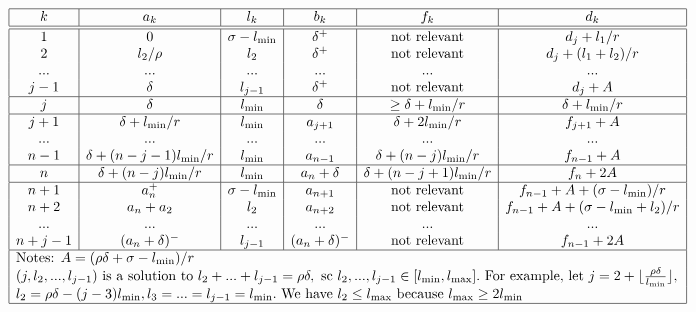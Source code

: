 \begin{preuve}
{\begin{table*}[!htbp]
 \hspace{-1cm}
   $$\begin{array}{|c|c|c|c|c|c|}
 \hline
  k & a_k & l_k & b_k & f_k & d_k \\
 \hline
 \hline
 1 & 0 & \sigma -  l_{\min} & \delta^+ & \mbox{not relevant} & d_j+l_1/r\\
 2 & l_2/\rho & l_{2} & \delta^+ & \mbox{not relevant} & d_j+(l_1+l_2)/r\\
 ... & ... & ... & ... &... & ... \\
 j-1 &  \delta & l_{j-1} & \delta^+ & \mbox{not relevant} & d_j +A \\
 \hline
 j & \delta & l_{\min} & \delta & \geq \delta +l_{\min}/r  & \delta +l_{\min}/r \\
 \hline
 j+1& \delta+l_{\min}/r & l_{\min} & a_{j+1} & \delta+2 l_{\min}/r
 & f_{j+1} + A \\
 ... & ... & ... & ... &... & ... \\
 n-1 & \delta+ (n-j-1)l_{\min}/r & l_{\min} & a_{n-1} & \delta+(n-j) l_{\min}/r & f_{n-1} + A \\
 \hline
 n & \delta+ (n-j)l_{\min}/r & l_{\min} & a_n + \delta & \delta+(n-j+1) l_{\min}/r & f_n + 2 A \\
 \hline
 n+1 & a_n^+ & \sigma - l_{\min} & a_{n+1} & \mbox{not relevant} & f_{n-1}+A+(\sigma - l_{\min} )/r\\
 n+2 & a_n+a_2 & l_{2} & a_{n+2} & \mbox{not relevant} & f_{n-1}+A+(\sigma - l_{\min}+l_2 )/r\\
 ... & ... & ... & ... &... &...  \\
 n+j-1 & (a_n + \delta)^- & l_{j-1} & (a_n +\delta)^- & \mbox{not relevant} & f_{n-1}+2A\\
 \hline
 \multicolumn{6}{|l|}{
\mbox{Notes: } A=(\rho \delta +\sigma - l_{\min})/r }\\
 \multicolumn{6}{|l|}{
  (j, l_2,...,l_{j-1}) \mbox{ is a solution to } l_2 + ... + l_{j-1}= \rho \delta,
  \mbox{ sc }  l_2, ..., l_{j-1}\in [l_{\min}, l_{\max}].
  \mbox{ For example, let }j=2+\lfloor \frac{\rho
  \delta}{l_{\min}}\rfloor,}\\
  \multicolumn{6}{|l|}{l_2=\rho \delta-(j-3)l_{\min},
  l_3=...=l_{j-1}=l_{\min}. \mbox{ We have }l_2\leq l_{\max} \mbox{ because }l_{\max}\geq 2 l_{\min}}\\
 \hline
  \end{array}
  $$
\end{table*}
}
\end{preuve}


